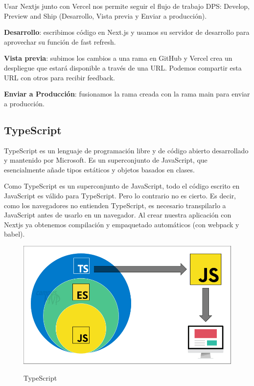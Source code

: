 \documentclass[12pt,twoside,titlepage]{report}
\begin{document}
Usar Nextjs junto con Vercel nos permite seguir el flujo de trabajo DPS: Develop, Preview and Ship (Desarrollo, Vista previa y Enviar a producción).

\begin{compactitem}
    \item \textbf{Desarrollo}: escribimos código en Next.js y usamos su servidor de desarrollo para aprovechar su función de fast refresh.
    \item \textbf{Vista previa}: subimos los cambios a una rama en GitHub y Vercel crea un despliegue que estará disponible a través de una URL. Podemos compartir esta URL con otros para recibir feedback.
    \item \textbf{Enviar a Producción}: fusionamos la rama creada con la rama main para enviar a producción.
\end{compactitem}

\subsection{TypeScript}

TypeScript es un lenguaje de programación libre y de código abierto desarrollado y mantenido por Microsoft. Es un superconjunto de JavaScript, que esencialmente añade tipos estáticos y objetos basados en clases.

Como TypeScript es un superconjunto de JavaScript, todo el código escrito en JavaScript es válido para TypeScript. Pero lo contrario no es cierto. Es decir, como los navegadores no entienden TypeScript, es necesario transpilarlo a JavaScript antes de usarlo en un navegador. Al crear nuestra aplicación con Nextjs ya obtenemos compilación y empaquetado automáticos (con webpack y babel).

\begin{figure}[H]
    \centering
    \includegraphics[scale=0.4]{TypeScript/TypeScript}
    \label{fig:TypeScript}
    \caption{TypeScript}
\end{figure}
\end{document}
